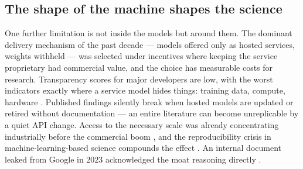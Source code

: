 \documentclass[11pt,a4paper]{article}
\begin{document}
\subsection{The shape of the machine shapes the science}
\label{sec:saas}

One further limitation is not inside the models but around them. The dominant
delivery mechanism of the past decade --- models offered only as hosted
services, weights withheld --- was selected under incentives where keeping
the service proprietary had commercial value, and the choice has measurable
costs for research. Transparency scores for major developers are low, with
the worst indicators exactly where a service model hides things: training
data, compute, hardware \autocite{bommasani2023fmti}. Published findings
silently break when hosted models are updated or retired without
documentation \autocite{pozzobon2023blackbox} --- an entire literature can
become unreplicable by a quiet API change. Access to the necessary scale was
already concentrating industrially before the commercial boom
\autocite{ahmed2020dedemocratization}, and the reproducibility crisis in
machine-learning-based science compounds the effect
\autocite{kapoor2023leakage}. An internal document leaked from Google in
2023 acknowledged the moat reasoning directly
\autocite{patel2023nomoat}.
\end{document}

